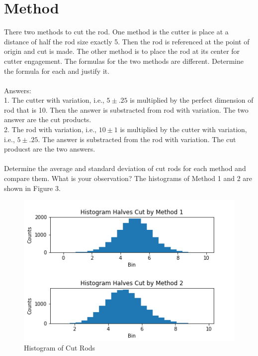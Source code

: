 \documentclass[10pt,a4paper]{article}
\begin{document}
\noindent \section{Method}    There two methods to cut the rod. One method is the cutter is place at  a    distance of half the rod size exactly 5. Then the rod is referenced at the    point of origin and cut is made.  The other method is to place the rod    at its center for cutter engagement. The formulas for the two methods are    different. Determine the formula for each and justify it.
\noindent \\ \\ Answers: \\ 1. The cutter with variation, i.e., $5 \pm .25$  is    multiplied by the perfect dimension of rod that is 10. Then the answer is    substracted from rod with variation. The two answer are the cut products.    \\ 2. The rod with variation, i.e., $ 10 \pm 1$ is multiplied by the    cutter with variation, i.e., $5 \pm .25$. The answer is substracted from    the rod with variation. The cut producst are the two answers. \\ \\    Determine the average and standard deviation of cut rods for each method    and compare them. What is your observation?
\noindent The histograms of Method 1 and 2 are shown in Figure 3.
\begin{figure}[H]
\centering\includegraphics[width=1\linewidth,height=0.5\textheight]{Fig03}
\caption{Histogram of Cut Rods}
\label{fig:Fig03}
\end{figure}
\end{document}
